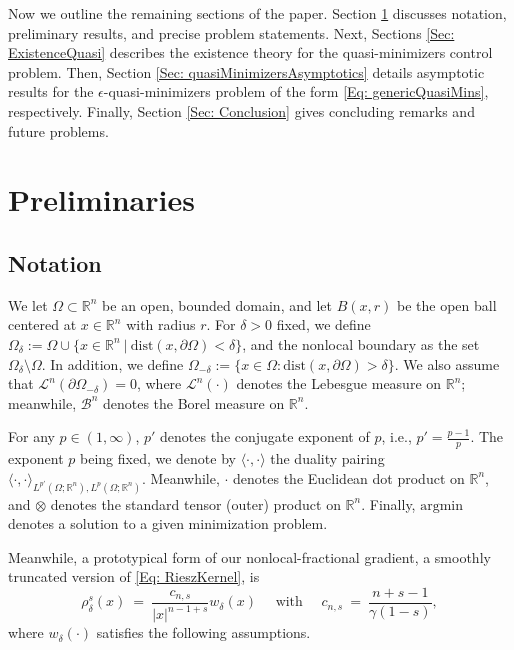 \documentclass[11pt, reqno]{amsart}   	%
\theoremstyle{plain}
\numberwithin{equation}{section}
\def\de{\delta}
\def\ep{\epsilon}
\def\Om{\Omega}
\def\pa{\partial}
\def\R{\mathbb{R}}
\def\lang{\langle}
\def\rang{\rangle}
\def\Bor{\mathcal{B}}
\def\Lin{\mathcal{L}}
\def\argmin{\text{argmin}}
\def\dist{\text{dist}}
\begin{document}
Now we outline the remaining sections of the paper. Section \ref{Sec: prelim} discusses notation, preliminary results, and precise problem statements. Next, Sections \ref{Sec: ExistenceQuasi} describes the existence theory for the quasi-minimizers control problem. Then, Section \ref{Sec: quasiMinimizersAsymptotics} details asymptotic results for the $\ep$-quasi-minimizers problem of the form \eqref{Eq: genericQuasiMins}, respectively.  Finally, Section \ref{Sec: Conclusion} gives concluding remarks and future problems.






\section{Preliminaries}\label{Sec: prelim}

\subsection{Notation}\label{Subsec: Notation}

We let $\Om \subset \R^n$ be an open, bounded domain, and let $B(x, r)$ be the open ball centered at $x \in \R^n$ with radius $r$. For $\de > 0$ fixed, we define $\Om_{\de} := \Om \cup \{x \in \R^n \ | \ \dist(x, \pa \Om) < \de\}$, and the nonlocal boundary as the set $\Om_{\de}\setminus \Om$. In addition, we define $\Om_{-\de} := \{x \in \Om: \dist(x, \pa \Om) > \de\}$. We also assume that $\Lin^n(\pa \Om_{-\de}) = 0$, where $\Lin^n(\cdot)$ denotes the Lebesgue measure on $\R^n$; meanwhile, $\Bor^n$ denotes the Borel measure on $\R^n$.

For any $p \in (1, \infty)$, $p'$ denotes the conjugate exponent of $p$, i.e., $p' = \frac{p - 1}{p}$. The exponent $p$ being fixed, we denote by $\lang \cdot, \cdot\rang$ the duality pairing $\lang \cdot, \cdot\rang_{L^{p'}(\Om; \R^n), L^p(\Om; \R^n)}$. Meanwhile, $\cdot$ denotes the Euclidean dot product on $\R^n$, and $\otimes$ denotes the standard tensor (outer) product on $\R^n$. Finally, $\argmin$ denotes a solution to a given minimization problem.

Meanwhile, a prototypical form of our nonlocal-fractional gradient, a smoothly truncated version of \eqref{Eq: RieszKernel}, is
\begin{equation}\label{Eq: kernelRhosDe}
		\rho^s_{\de}(x) \ = \ \frac{c_{n,s}}{ |x|^{n-1+s}}w_\de(x) \quad \text{ with } \quad c_{n,s} \:= \ \frac{n+s-1}{\gamma(1-s)},
	\end{equation}
    where $w_{\de}(\cdot)$ satisfies the following assumptions.
\end{document}
